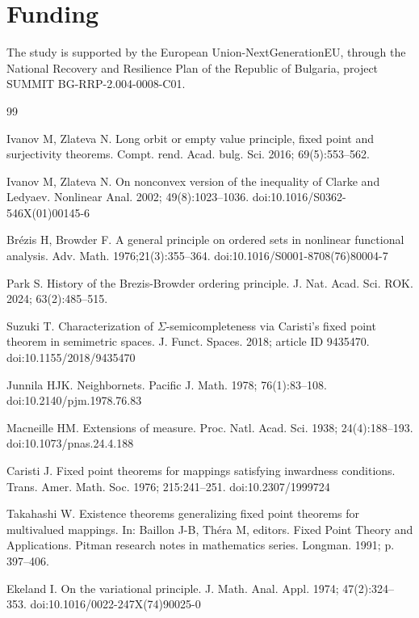 \documentclass[12pt]{article}
\begin{document}
\section*{Funding}
The study  is supported by  the European Union-NextGenerationEU, through the National Recovery and Resilience Plan of the Republic of Bulgaria,  project  SUMMIT BG-RRP-2.004-0008-C01.

\begin{thebibliography}{99}

Ivanov M, Zlateva N.  Long orbit or empty value principle, fixed point and surjectivity theorems. Compt. rend. Acad. bulg. Sci. 2016; 69(5):553--562.

Ivanov M, Zlateva N.  On nonconvex version of the inequality of Clarke and Ledyaev. Nonlinear Anal. 2002; 49(8):1023--1036. doi:10.1016/S0362-546X(01)00145-6

Br\'ezis H, Browder F.  A general principle on ordered sets in nonlinear functional analysis.
 Adv. Math. 1976;21(3):355--364. doi:10.1016/S0001-8708(76)80004-7
 
Park S.  History of the Brezis-Browder ordering principle. J. Nat. Acad. Sci. ROK. 2024; 63(2):485--515.

Suzuki T.   Characterization of $\Sigma$-semicompleteness via Caristi's fixed
point theorem in semimetric spaces. J. Funct. Spaces. 2018;  article ID 9435470. doi:10.1155/2018/9435470

Junnila HJK. Neighbornets. Pacific J. Math. 1978; 76(1):83--108. doi:10.2140/pjm.1978.76.83

Macneille HM. Extensions of measure. Proc. Natl. Acad. Sci. 1938; 24(4):188--193. doi:10.1073/pnas.24.4.188 

Caristi J. Fixed point theorems for mappings satisfying inwardness conditions. Trans. Amer. Math. Soc.
1976; 215:241--251. doi:10.2307/1999724

Takahashi W. Existence theorems generalizing fixed point theorems for multivalued mappings. In: Baillon J-B,
 Th\'era M, editors.  Fixed Point Theory and Applications. Pitman research notes in mathematics series. Longman. 1991; p. 397--406.
 
Ekeland I. On the variational principle. J. Math. Anal. Appl. 1974; 47(2):324--353. doi:10.1016/0022-247X(74)90025-0


\end{thebibliography}
\end{document}
